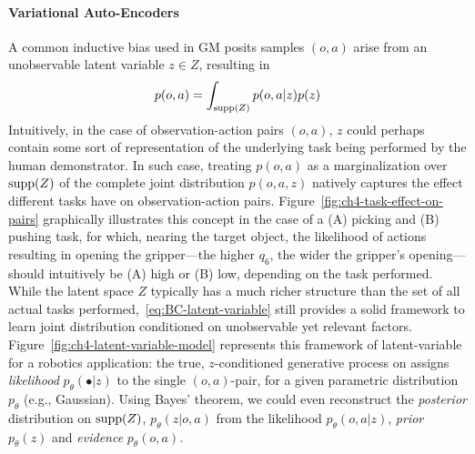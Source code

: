 \paragraph{Variational Auto-Encoders}
A common inductive bias used in GM posits samples \( (o,a) \) arise from an unobservable latent variable \( z \in Z \), resulting in
\begin{equation}\label{eq:BC-latent-variable}
    p (o,a) = \int_{\text{supp}({Z})} p(o,a \vert z) p(z)
\end{equation}
Intuitively, in the case of observation-action pairs \( (o, a) \), \( z \) could perhaps contain some sort of representation of the underlying task being performed by the human demonstrator.
In such case, treating \( p(o,a) \) as a marginalization over \( \text{supp}({Z}) \) of the complete joint distribution \( p(o,a,z) \) natively captures the effect different tasks have on observation-action pairs.
Figure~\ref{fig:ch4-task-effect-on-pairs} graphically illustrates this concept in the case of a (A) picking and (B) pushing task, for which, nearing the target object, the likelihood of actions resulting in opening the gripper---the higher \( q_6 \), the wider the gripper's opening---should intuitively be (A) high or (B) low, depending on the task performed.
While the latent space \( Z \) typically has a much richer structure than the set of all actual tasks performed,~\ref{eq:BC-latent-variable} still provides a solid framework to learn joint distribution conditioned on unobservable yet relevant factors.
Figure~\ref{fig:ch4-latent-variable-model} represents this framework of latent-variable for a robotics application: the true, \( z \)-conditioned generative process on assigns \emph{likelihood} \( p_\theta(\bullet \vert z) \) to the single \( (o,a) \)-pair, for a given parametric distribution \(p_\theta \) (e.g., Gaussian).
Using Bayes' theorem, we could even reconstruct the \emph{posterior} distribution on \( \text{supp}({Z}) \), \( p_\theta(z \vert o,a) \) from the likelihood \( p_\theta(o,a \vert z) \), \emph{prior} \( p_\theta(z) \) and \emph{evidence} \( p_\theta(o,a) \).


